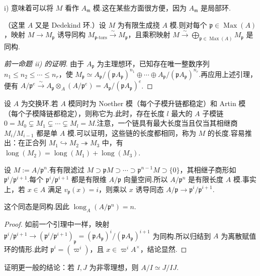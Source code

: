i) 意味着可以将 $M$ 看作 $A_{\mathfrak m}$ 模.这在某些方面很方便，因为 $A_{\mathfrak m}$ 是局部环.
\begin{corollary*}
（这里 $A$ 又是 Dedekind 环.）设 $M$ 为有限生成挠 $A$ 模.则对每个 $\mathfrak p\in\operatorname{Max}(A)$，映射 $M\longrightarrow M_{\mathfrak p}$ 诱导同构 $M_{\mathfrak p\text{-}\mathrm{tors}}\xrightarrow{\sim}M_{\mathfrak p}$，且乘积映射 $M\xrightarrow{\sim}\bigoplus_{\mathfrak p\in\operatorname{Max}(A)}M_{\mathfrak p}$ 是同构.
\end{corollary*}
\begin{proof}[前一命题 ii) 的证明]
由于 $A_{\mathfrak p}$ 为主理想环，已知存在唯一整数序列 $n_1\le n_2\le\cdots\le n_r$，使 $M_{\mathfrak p}\simeq A_{\mathfrak p}/(\mathfrak pA_{\mathfrak p})^{n_1}\oplus\cdots\oplus A_{\mathfrak p}/(\mathfrak pA_{\mathfrak p})^{n_r}$.再应用上述引理，便有 $A/\mathfrak p^e\xrightarrow{\sim}A_{\mathfrak p}\otimes_A(A/\mathfrak p^e)=A_{\mathfrak p}/(\mathfrak pA_{\mathfrak p})^e$.
\end{proof}
\begin{remark*}[有限长度模的``回顾'']
设 $A$ 为交换环.若 $A$ 模同时为 Noether 模（每个子模升链都稳定）和 Artin 模（每个子模降链都稳定），则称它为.此时，存在长度 $l$ 最大的 $A$ 子模链 $0=M_0\subsetneq M_1\subsetneq\cdots\subsetneq M_l=M$.注意，一个链具有最大长度当且仅当其相继商 $M_i/M_{i-1}$ 都是单 $A$ 模.可以证明，这些链的长度都相同，称为 $M$ 的长度.容易推出：在正合列 $M_1\hookrightarrow M_2\twoheadrightarrow M_3$ 中，有 $\operatorname{long}(M_2)=\operatorname{long}(M_1)+\operatorname{long}(M_3)$.
\end{remark*}
设 $M:=A/\mathfrak p^n$.有有限滤过 $M\supset\mathfrak pM\supset\cdots\supset\mathfrak p^{n-1}M\supset\{0\}$，其相继子商形如 $\mathfrak p^i/\mathfrak p^{i+1}$.每个 $\mathfrak p^i/\mathfrak p^{i+1}$ 都是有限维 $A/\mathfrak p$ 向量空间.所以 $A/\mathfrak p^n$ 是有限长度 $A$ 模.事实上，若 $x\in A$ 满足 $v_{\mathfrak p}(x)=i$，则乘以 $x$ 诱导同态 $A/\mathfrak p\longrightarrow\mathfrak p^i/\mathfrak p^{i+1}$.
\begin{lemma*}
这个同态是同构.因此 $\operatorname{long}_A(A/\mathfrak p^n)=n$.
\end{lemma*}
\begin{proof}
如前一个引理中一样，映射 $\mathfrak p^i/\mathfrak p^{i+1}\longrightarrow(\mathfrak p^i/\mathfrak p^{i+1})_{\mathfrak p}=(\mathfrak pA_{\mathfrak p})^i/(\mathfrak pA_{\mathfrak p})^{i+1}$ 为同构.所以归结到 $A$ 为离散赋值环的情形.此时 $\mathfrak p^i=(\varpi^i)$，且 $x\in\varpi^iA^\times$，结论显然.
\end{proof}
\begin{exercise*}
证明更一般的结论：若 $I,J$ 为非零理想，则 $A/I\simeq J/IJ$.
\end{exercise*}
